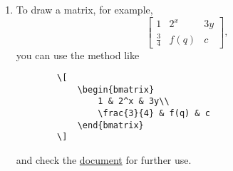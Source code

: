 \documentclass{OR_SolutionTheme}
\begin{document}
\begin{description}
\begin{enumerate}
\begin{verbatim}
                D_{ij} & \forall i\in I, \ j\in J \\
                & x_k \geq 0 \quad \forall k\in K. &
            \end{array}
        \]
        \end{verbatim}
        Note that you have to invoke \texttt{amsmath} 
        and \texttt{array}
        packages before writing equations, respectively.
        You can read the \href{https://www.overleaf.com/learn/latex/Aligning_equations_with_amsmath}{\texttt{amsmath}} and 
        \href{https://www.overleaf.com/learn/latex/Tables}{\texttt{array}} package
        details to extend your program.
        
        \item To draw a matrix, for example,
        \[
            \begin{bmatrix}
                1 & 2^x & 3y\\
                \frac{3}{4} & f(q) & c
            \end{bmatrix},
        \]
        you can use the method like
        \begin{verbatim}
        \[
            \begin{bmatrix}
                1 & 2^x & 3y\\
                \frac{3}{4} & f(q) & c
            \end{bmatrix}
        \]
        \end{verbatim}
        and check the \href{https://www.overleaf.com/learn/latex/Matrices}{document} for further use.
        

\end{enumerate}
\end{description}
\end{document}
